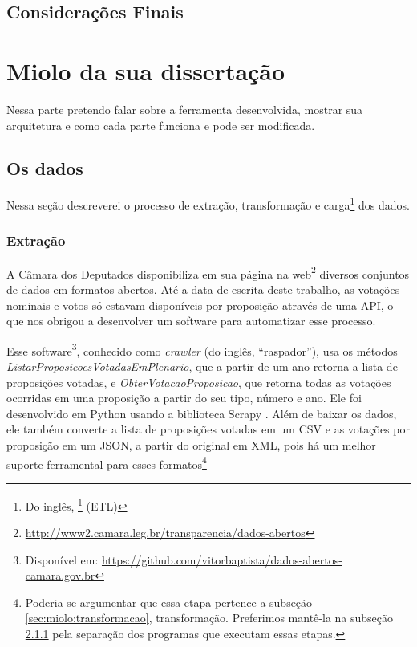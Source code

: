 \documentclass[a4paper,titlepage]{ppgi}\usepackage[]{graphicx}\usepackage[]{color}
\begin{document}
\section{Considerações Finais}









\chapter{Miolo da sua dissertação}\label{cap:miolo}

Nessa parte pretendo falar sobre a ferramenta desenvolvida, mostrar sua arquitetura e como cada parte funciona e pode ser modificada.

\section{Os dados}

Nessa seção descreverei o processo de extração, transformação e
carga\footnote{Do inglês, \footnote{extract, transform, load} (ETL)} dos dados.

\subsection{Extração}
\label{sec:miolo:extracao}

A Câmara dos Deputados disponibiliza em sua página na
web\footnote{\url{http://www2.camara.leg.br/transparencia/dados-abertos}}
diversos conjuntos de dados em formatos abertos. Até a data de escrita deste
trabalho, as votações nominais e votos só estavam disponíveis por proposição através
de uma \gls{API}, o que nos obrigou a desenvolver um software para automatizar
esse processo.

Esse software\footnote{Disponível em:
\url{https://github.com/vitorbaptista/dados-abertos-camara.gov.br}}, conhecido como \emph{crawler} (do inglês, ``raspador''), usa os
métodos \emph{ListarProposicoesVotadasEmPlenario}, que a partir de um ano
retorna a lista de proposições votadas, e \emph{ObterVotacaoProposicao}, que
retorna todas as votações ocorridas em uma proposição a partir do seu tipo,
número e ano. Ele foi desenvolvido em Python usando a biblioteca Scrapy
\cite{Python276,Scrapy}. Além de baixar os dados, ele também converte a lista
de proposições votadas em um \gls{CSV} e as votações por proposição em um
\gls{JSON}, a partir do original em \gls{XML}, pois há um melhor suporte
ferramental para esses formatos\footnote{Poderia se argumentar que essa etapa
pertence a subseção \ref{sec:miolo:transformacao}, transformação. Preferimos
mantê-la na subseção \ref{sec:miolo:extracao} pela separação dos programas que
executam essas etapas.}
\end{document}
